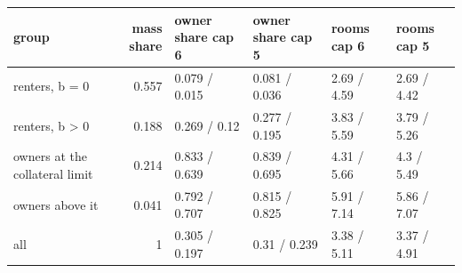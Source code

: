 \begingroup\small
\setlength{\tabcolsep}{3pt}
\renewcommand{\arraystretch}{1.04}
\begin{tabularx}{\linewidth}{XrXXXX}
\toprule
group & mass share & owner share cap 6 & owner share cap 5 & rooms cap 6 & rooms cap 5 \\
\midrule
renters, b = 0 & 0.557 & 0.079 / 0.015 & 0.081 / 0.036 & 2.69 / 4.59 & 2.69 / 4.42 \\
renters, b \textgreater{} 0 & 0.188 & 0.269 / 0.12 & 0.277 / 0.195 & 3.83 / 5.59 & 3.79 / 5.26 \\
owners at the collateral limit & 0.214 & 0.833 / 0.639 & 0.839 / 0.695 & 4.31 / 5.66 & 4.3 / 5.49 \\
owners above it & 0.041 & 0.792 / 0.707 & 0.815 / 0.825 & 5.91 / 7.14 & 5.86 / 7.07 \\
all & 1 & 0.305 / 0.197 & 0.31 / 0.239 & 3.38 / 5.11 & 3.37 / 4.91 \\
\bottomrule
\end{tabularx}
\endgroup
